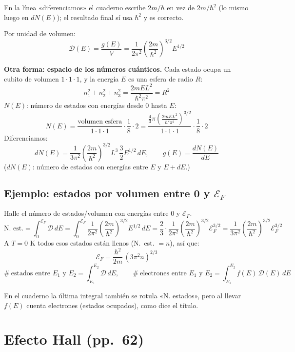 \documentclass[11pt,a4paper]{article}
\newcommand{\pags}[1]{{\normalfont\small\color{gris}(pp.~#1)}}
\newcommand{\Ep}{\mathcal{E}}
\begin{document}
\begin{obs}
En la línea «diferenciamos» el cuaderno escribe $2m/\hbar$ en vez de $2m/\hbar^2$ (lo mismo luego en $dN(E)$); el resultado final sí
usa $\hbar^2$ y es correcto.
\end{obs}

Por unidad de volumen:
\[
\boxed{\mathcal D(E)=\frac{g(E)}{V}=\frac{1}{2\pi^2}\left(\frac{2m}{\hbar^2}\right)^{3/2}E^{1/2}}
\]

\textbf{Otra forma: espacio de los números cuánticos.} Cada estado ocupa un cubito de volumen $1\cdot1\cdot1$, y la energía $E$ es una
esfera de radio $R$:
\[
n_1^2+n_2^2+n_3^2=\frac{2mEL^2}{\hbar^2\pi^2}=R^2
\]
$N(E)$: número de estados con energías desde 0 hasta $E$:
\[
N(E)=\frac{\text{volumen esfera}}{1\cdot1\cdot1}\cdot\frac18\cdot2=\frac{\frac43\pi\left(\frac{2mEL^2}{\hbar^2\pi^2}\right)^{3/2}}{1\cdot1\cdot1}\cdot\frac18\cdot2
\]
Diferenciamos:
\[
dN(E)=\frac{1}{3\pi^2}\left(\frac{2m}{\hbar^2}\right)^{3/2}L^3\,\frac32E^{1/2}\,dE,\qquad g(E)=\frac{dN(E)}{dE}
\]
($dN(E)$: número de estados con energías entre $E$ y $E+dE$.)

\subsection{Ejemplo: estados por volumen entre 0 y $\Ep_F$}
Halle el número de estados/volumen con energías entre 0 y $\Ep_F$.
\[
\text{N. est.}=\int_0^{\Ep_F}\mathcal D\,dE=\int_0^{\Ep_F}\frac{1}{2\pi^2}\left(\frac{2m}{\hbar^2}\right)^{3/2}E^{1/2}\,dE
=\frac23\cdot\frac{1}{2\pi^2}\left(\frac{2m}{\hbar^2}\right)^{3/2}\Ep_F^{3/2}
=\frac{1}{3\pi^2}\left(\frac{2m}{\hbar^2}\right)^{3/2}\Ep_F^{3/2}
\]
A $T=0$ K todos esos estados están llenos (N.~est. $=n$), así que:
\[
\boxed{\Ep_F=\frac{\hbar^2}{2m}\,(3\pi^2n)^{2/3}}
\]
\[
\#\ \text{estados entre }E_1\text{ y }E_2=\int_{E_1}^{E_2}\mathcal D\,dE,\qquad
\#\ \text{electrones entre }E_1\text{ y }E_2=\int_{E_1}^{E_2}f(E)\,\mathcal D(E)\,dE
\]

\begin{obs}
En el cuaderno la última integral también se rotula «N. estados», pero al llevar $f(E)$ cuenta electrones (estados ocupados),
como dice el título.
\end{obs}

\section{Efecto Hall \pags{62}}
\end{document}
